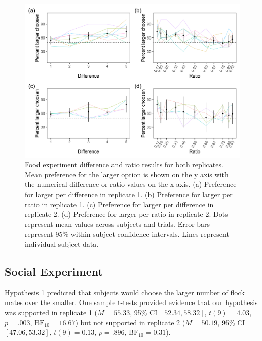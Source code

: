 \documentclass[
  ,doc,floatsintext]{apa6}
\begin{document}
\begin{figure}

{\centering \includegraphics[width=1\linewidth]{../figures/food_figure} 

}

\caption{Food experiment difference and ratio results for both replicates. Mean preference for the larger option is shown on the y axis with the numerical difference or ratio values on the x axis. (a) Preference for larger per difference in replicate 1. (b) Preference for larger per ratio in replicate 1. (c) Preference for larger per difference in replicate 2. (d) Preference for larger per ratio in replicate 2. Dots represent mean values across subjects and trials. Error bars represent 95\% within-subject confidence intervals. Lines represent individual subject data.}\label{fig:foodgraphs}
\end{figure}

\hypertarget{social-experiment-1}{%
\subsection{Social Experiment}\label{social-experiment-1}}

Hypothesis 1 predicted that subjects would choose the larger number of flock mates over the smaller. One sample t-tests provided evidence that our hypothesis was supported in replicate 1 (\(M = 55.33\), 95\% CI \([52.34, 58.32]\), \(t(9) = 4.03\), \(p = .003\), \(\mathrm{BF}_{\textrm{10}} = 16.67\)) but not supported in replicate 2 (\(M = 50.19\), 95\% CI \([47.06, 53.32]\), \(t(9) = 0.13\), \(p = .896\), \(\mathrm{BF}_{\textrm{10}} = 0.31\)).
\end{document}
